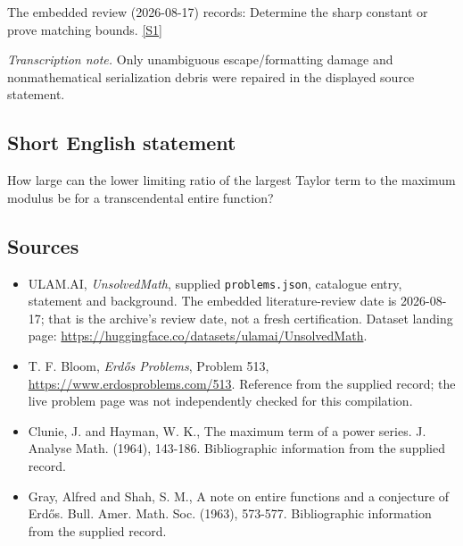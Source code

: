 \documentclass[11pt,a4paper]{article}
\newcommand{\sref}[2]{\hyperlink{source:#1:#2}{[S#2]}}
\begin{document}
The embedded review (2026-08-17) records: Determine the sharp constant or prove matching bounds. \sref{statement}{1}

{\small\emph{Transcription note.} Only unambiguous escape/formatting damage and nonmathematical serialization debris were repaired in the displayed source statement.}

\subsection{Short English statement}

How large can the lower limiting ratio of the largest Taylor term to the maximum modulus be for a transcendental entire function?

\subsection{Sources}

{\small

\begin{itemize}

\item[\hypertarget{source:statement:1}{S1}] ULAM.AI, \emph{UnsolvedMath}, supplied \texttt{problems.json}, catalogue entry, statement and background. The embedded literature-review date is 2026-08-17; that is the archive’s review date, not a fresh certification. Dataset landing page: \url{https://huggingface.co/datasets/ulamai/UnsolvedMath}.

\item[\hypertarget{source:statement:2}{S2}] T. F. Bloom, \emph{Erdős Problems}, Problem 513, \url{https://www.erdosproblems.com/513}. Reference from the supplied record; the live problem page was not independently checked for this compilation.

\item[\hypertarget{source:statement:3}{S3}] Clunie, J. and Hayman, W. K., The maximum term of a power series. J. Analyse Math. (1964), 143-186. Bibliographic information from the supplied record.

\item[\hypertarget{source:statement:4}{S4}] Gray, Alfred and Shah, S. M., A note on entire functions and a conjecture of Erd\H{o}s. Bull. Amer. Math. Soc. (1963), 573-577. Bibliographic information from the supplied record.

\end{itemize}

}

\label{end:statement}
\end{document}
